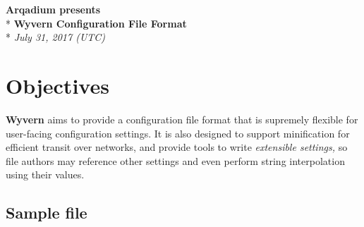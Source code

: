 \documentclass[12pt,english]{article}
\begin{document}
\begin{center}

\vspace*{9cm}

\Large{\textbf{Arqadium presents}} \\*
\vspace*{0.25cm}
\Huge{\textbf{Wyvern Configuration File Format}} \\*
\vspace*{1cm}
\large{\textit{July 31, 2017 (UTC)}}
\end{center}

\clearpage{}

\tableofcontents{}

\clearpage{}

\section{Objectives}

\textbf{Wyvern} aims to provide a configuration file format that is supremely
flexible for user-facing configuration settings. It is also designed to
support minification for efficient transit over networks, and provide tools
to write \textit{extensible settings,} so file authors may reference other
settings and even perform string interpolation using their values.

\subsection{Sample file}
\end{document}
